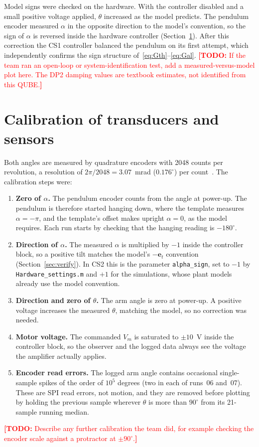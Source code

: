 \documentclass[11pt,a4paper]{article}
\newcommand{\todo}[1]{\textcolor{red}{\textbf{[TODO:} #1\textbf{]}}}
\begin{document}
Model signs were checked on the hardware. With the controller disabled and
a small positive voltage applied, $\theta$ increased as the model
predicts. The pendulum encoder measured $\alpha$ in the opposite direction
to the model's convention, so the sign of $\alpha$ is reversed inside the
hardware controller (Section~\ref{sec:calib}). After this correction the CS1
controller balanced the pendulum on its first attempt, which independently
confirms the sign structure of~\eqref{eq:Gth}--\eqref{eq:Gal}.
\todo{If the team ran an open-loop or system-identification test, add a
measured-versus-model plot here. The DP2 damping values are textbook
estimates, not identified from this QUBE.}

\section{Calibration of transducers and sensors}\label{sec:calib}
Both angles are measured by quadrature encoders with 2048 counts per
revolution, a resolution of $2\pi/2048=3.07$~mrad ($0.176^\circ$) per
count~\cite{qube_manual}. The calibration steps were:
\begin{enumerate}[nosep]
\item \textbf{Zero of $\alpha$.} The pendulum encoder counts from the angle
  at power-up. The pendulum is therefore started hanging down, where the
  template measures $\alpha=-\pi$, and the template's offset makes upright
  $\alpha=0$, as the model requires. Each run starts by checking that the
  hanging reading is $-180^\circ$.
\item \textbf{Direction of $\alpha$.} The measured $\alpha$ is multiplied
  by $-1$ inside the controller block, so a positive tilt matches the
  model's $-\bm e_t$ convention (Section~\ref{sec:verify}). In CS2 this is
  the parameter \texttt{alpha\_sign}, set to $-1$ by
  \texttt{Hardware\_settings.m} and $+1$ for the simulations, whose plant
  models already use the model convention.
\item \textbf{Direction and zero of $\theta$.} The arm angle is zero at
  power-up. A positive voltage increases the measured $\theta$, matching
  the model, so no correction was needed.
\item \textbf{Motor voltage.} The commanded $V_m$ is saturated to
  $\pm10$~V inside the controller block, so the observer and the logged data
  always see the voltage the amplifier actually applies.
\item \textbf{Encoder read errors.} The logged arm angle contains
  occasional single-sample spikes of the order of $10^5$ degrees (two in
  each of runs~06 and~07). These are SPI read errors, not motion, and they
  are removed before plotting by holding the previous sample wherever
  $\theta$ is more than $90^\circ$ from its 21-sample running median.
\end{enumerate}
\todo{Describe any further calibration the team did, for example
checking the encoder scale against a protractor at $\pm90^\circ$.}
\end{document}
